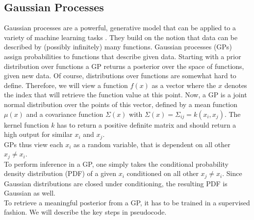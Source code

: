 \documentclass[a4paper,cleardoubleempty,BCOR1cm, 11pt]{report}
\begin{document}
\subsection{Gaussian Processes}\label{sec:gp}
Gaussian processes are a powerful, generative model that can be applied to a variety of machine learning tasks \cite{mackay1998introduction}. They build on the notion that data can be described by (possibly infinitely) many functions. Gaussian processes (GPs) assign probabilities to functions that describe given data. Starting with a prior distribution over functions a GP returns a posterior over the space of functions, given new data. Of course, distributions over functions are somewhat hard to define. Therefore, we will view a function $f(x)$ as a vector where the $x$ denotes the index that will retrieve the function value at this point. Now, a GP is a joint normal distribution over the points of this vector, defined by a mean function $\mu(x)$ and a covariance function $\Sigma(x)$ with $\Sigma(x) = \Sigma_{ij} = k(x_i,x_j)$. The kernel function $k$ has to return a positive definite matrix and should return a high output for similar $x_i$ and $x_j$.\\
GPs thus view each $x_i$ as a random variable, that is dependent on all other $x_j\neq x_i$.\\
To perform inference in a GP, one simply takes the conditional probability density distribution (PDF) of a given $x_i$ conditioned on all other $x_j\neq x_i$. Since Gaussian distributions are closed under conditioning, the resulting PDF is Gaussian as well.\\
To retrieve a meaningful posterior from a GP, it has to be trained in a supervised fashion. We will describe the key steps in pseudocode.
\end{document}
